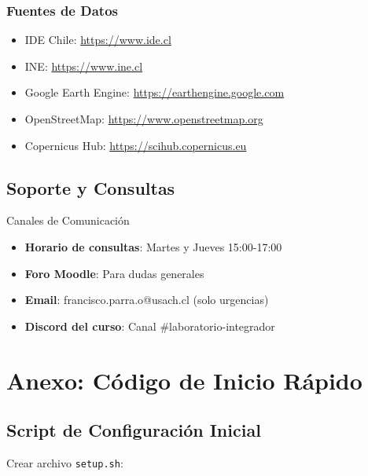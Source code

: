 \documentclass[12pt,a4paper]{article}
\begin{document}
\subsubsection{Fuentes de Datos}
\begin{itemize}
    \item IDE Chile: \url{https://www.ide.cl}
    \item INE: \url{https://www.ine.cl}
    \item Google Earth Engine: \url{https://earthengine.google.com}
    \item OpenStreetMap: \url{https://www.openstreetmap.org}
    \item Copernicus Hub: \url{https://scihub.copernicus.eu}
\end{itemize}

\subsection{Soporte y Consultas}

\begin{taskbox}{Canales de Comunicación}
\begin{itemize}
    \item \textbf{Horario de consultas}: Martes y Jueves 15:00-17:00
    \item \textbf{Foro Moodle}: Para dudas generales
    \item \textbf{Email}: francisco.parra.o@usach.cl (solo urgencias)
    \item \textbf{Discord del curso}: Canal \#laboratorio-integrador
\end{itemize}
\end{taskbox}

\section{Anexo: Código de Inicio Rápido}

\subsection{Script de Configuración Inicial}

Crear archivo \texttt{setup.sh}:
\end{document}
